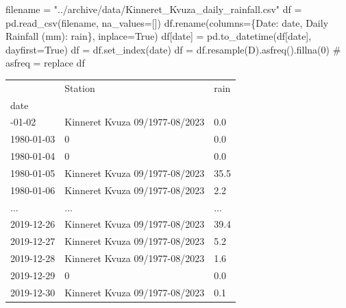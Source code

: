 \documentclass[
  letterpaper,
  DIV=11,
  numbers=noendperiod,
  oneside]{scrreprt}
\newenvironment{Shaded}{\begin{snugshade}}{\end{snugshade}}
\newcommand{\CommentTok}[1]{\textcolor[rgb]{0.37,0.37,0.37}{#1}}
\newcommand{\DecValTok}[1]{\textcolor[rgb]{0.68,0.00,0.00}{#1}}
\newcommand{\NormalTok}[1]{\textcolor[rgb]{0.00,0.23,0.31}{#1}}
\newcommand{\OperatorTok}[1]{\textcolor[rgb]{0.37,0.37,0.37}{#1}}
\newcommand{\StringTok}[1]{\textcolor[rgb]{0.13,0.47,0.30}{#1}}
\newcommand{\VariableTok}[1]{\textcolor[rgb]{0.07,0.07,0.07}{#1}}
\begin{document}
\begin{Shaded}
\begin{Highlighting}[]
\NormalTok{filename }\OperatorTok{=} \StringTok{"../archive/data/Kinneret\_Kvuza\_daily\_rainfall.csv"}
\NormalTok{df }\OperatorTok{=}\NormalTok{ pd.read\_csv(filename, na\_values}\OperatorTok{=}\NormalTok{[}\StringTok{\textquotesingle{}{-}\textquotesingle{}}\NormalTok{])}
\NormalTok{df.rename(columns}\OperatorTok{=}\NormalTok{\{}\StringTok{\textquotesingle{}Date\textquotesingle{}}\NormalTok{: }\StringTok{\textquotesingle{}date\textquotesingle{}}\NormalTok{,}
                   \StringTok{\textquotesingle{}Daily Rainfall (mm)\textquotesingle{}}\NormalTok{: }\StringTok{\textquotesingle{}rain\textquotesingle{}}\NormalTok{\}, inplace}\OperatorTok{=}\VariableTok{True}\NormalTok{)}
\NormalTok{df[}\StringTok{\textquotesingle{}date\textquotesingle{}}\NormalTok{] }\OperatorTok{=}\NormalTok{ pd.to\_datetime(df[}\StringTok{\textquotesingle{}date\textquotesingle{}}\NormalTok{], dayfirst}\OperatorTok{=}\VariableTok{True}\NormalTok{)}
\NormalTok{df }\OperatorTok{=}\NormalTok{ df.set\_index(}\StringTok{\textquotesingle{}date\textquotesingle{}}\NormalTok{)}
\NormalTok{df }\OperatorTok{=}\NormalTok{ df.resample(}\StringTok{\textquotesingle{}D\textquotesingle{}}\NormalTok{).asfreq().fillna(}\DecValTok{0}\NormalTok{)  }\CommentTok{\# asfreq = replace}
\NormalTok{df}
\end{Highlighting}
\end{Shaded}

\begin{longtable}[]{@{}lll@{}}
\toprule\noalign{}
& Station & rain \\
date & & \\
\midrule\noalign{}
\endhead
\bottomrule\noalign{}
\endlastfoot
1980-01-02 & Kinneret Kvuza 09/1977-08/2023 & 0.0 \\
1980-01-03 & 0 & 0.0 \\
1980-01-04 & 0 & 0.0 \\
1980-01-05 & Kinneret Kvuza 09/1977-08/2023 & 35.5 \\
1980-01-06 & Kinneret Kvuza 09/1977-08/2023 & 2.2 \\
... & ... & ... \\
2019-12-26 & Kinneret Kvuza 09/1977-08/2023 & 39.4 \\
2019-12-27 & Kinneret Kvuza 09/1977-08/2023 & 5.2 \\
2019-12-28 & Kinneret Kvuza 09/1977-08/2023 & 1.6 \\
2019-12-29 & 0 & 0.0 \\
2019-12-30 & Kinneret Kvuza 09/1977-08/2023 & 0.1 \\
\end{longtable}
\end{document}
